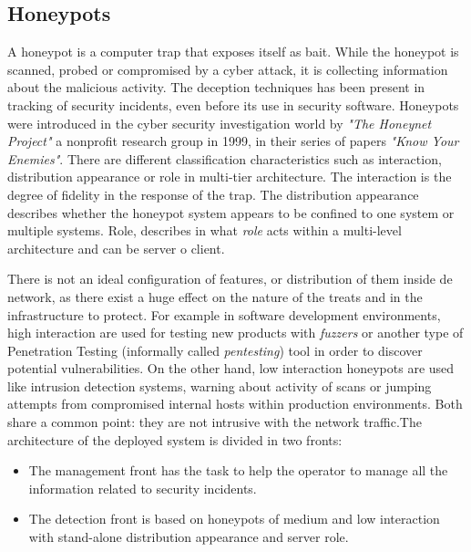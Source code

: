 \documentclass[a4paper]{llncs}
\begin{document}
\subsection{Honeypots}
A honeypot is a computer trap that exposes itself as bait. While the honeypot is scanned, probed or compromised by a cyber attack, it is collecting information about the malicious activity. The deception techniques has been present in tracking of security incidents\cite{Cheswick92anevening}, even before its use in security software\cite{DTK,RoleOfDeception}. Honeypots were introduced in the cyber security investigation world by {\it"The Honeynet Project"} a nonprofit research group in 1999, in their series of papers {\it"Know Your Enemies"}\cite{KnowYourEnemies}. There are different classification characteristics such as interaction, distribution appearance or role in multi-tier architecture\cite{Seifert06taxonomyof}. The interaction is the degree of fidelity in the response of the trap. The distribution appearance describes whether the honeypot system appears to be confined to one system or multiple systems. Role, describes in what {\it role} acts within a multi-level architecture and can be server o client.

There is not an ideal configuration of features, or distribution of them inside de network, as there exist a huge effect on the nature of the treats and in the infrastructure to protect. For example in software development environments, high interaction are used for testing new products with {\it fuzzers} or another type of Penetration Testing (informally called {\it pentesting}) tool \cite{fuzzingforsec} in order to discover potential vulnerabilities. On the other hand, low interaction honeypots are used like intrusion detection systems, warning about activity of scans or jumping attempts from compromised internal hosts within production environments. Both share a common point: they are not intrusive with the network traffic.The architecture of the deployed system is divided in two fronts:
\begin{itemize}
	\item The management front has the task to help the operator to manage all the information related to security incidents.
	\item The detection front is based on honeypots of medium and low interaction with stand-alone distribution appearance and server role.
\end{itemize}
\end{document}
